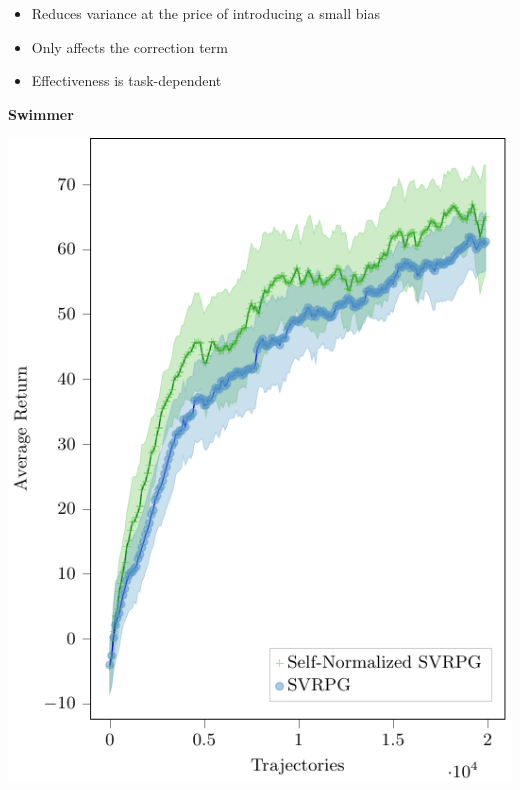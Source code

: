 \documentclass[aspectratio=169]{beamer}
\begin{document}
\begin{frame}
\begin{minipage}[]{.45\paperwidth}
\begin{itemize}
	\item Reduces variance at the price of introducing a small bias
	\item Only affects the correction term
	\item Effectiveness is task-dependent
\end{itemize}
\end{minipage}
\hfill%
\begin{minipage}[]{.35\paperwidth}
	\begin{center}
		\textbf{Swimmer}
	\end{center}
	\vspace*{-.25cm}
	\includegraphics[width=\textwidth]{images/normalization.pdf}
\end{minipage}

\end{frame}
\end{document}
